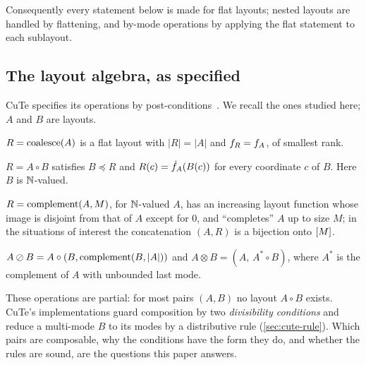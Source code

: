 \noindent Consequently every statement below is made for flat layouts; nested layouts are handled
by flattening, and by-mode operations by applying the flat statement to each sublayout.

\subsection{The layout algebra, as specified}\label{sec:spec}

CuTe specifies its operations by post-conditions~\cite{cutedocs,cecka2026}. We recall the ones
studied here; $A$ and $B$ are layouts.
\begin{description}[leftmargin=1.2em,itemsep=2pt]
\item[coalesce.] $R=\operatorname{coalesce}(A)$ is a flat layout with $|R|=|A|$ and $f_{R}=f_{A}$, of smallest
 rank.
\item[composition.] $R=A\circ B$ satisfies $B\preceq R$ and $R(c)=\hat{f}_{A}(B(c))$ for every
 coordinate $c$ of $B$. Here $B$ is $\mathbb{N}$-valued.
\item[complement.] $R=\operatorname{complement}(A,M)$, for $\mathbb{N}$-valued $A$, has an increasing layout function whose
 image is disjoint from that of $A$ except for $0$, and ``completes'' $A$ up to size $M$; in the
 situations of interest the concatenation $(A,R)$ is a bijection onto $[M]$.
\item[logical divide and product.]
 $A\oslash B=A\circ(B,\operatorname{complement}(B,|A|))$ and $A\otimes B=(A,\,A^{*}\circ B)$, where $A^*$ is the
 complement of $A$ with unbounded last mode.
\end{description}
These operations are partial: for most pairs $(A,B)$ no layout $A\circ B$ exists. CuTe's
implementations guard composition by two \emph{divisibility conditions} and reduce a multi-mode
$B$ to its modes by a distributive rule (\cref{sec:cute-rule}). Which pairs are composable, why
the conditions have the form they do, and whether the rules are sound, are the questions this paper
answers.
